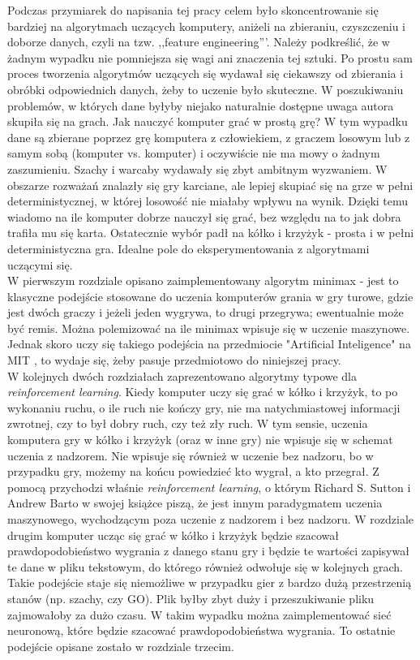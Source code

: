 \documentclass[licencjacka]{pracamgr}
\begin{document}
Podczas przymiarek do napisania tej pracy celem było skoncentrowanie się bardziej na algorytmach uczących komputery, aniżeli na zbieraniu, czyszczeniu i doborze danych, czyli na tzw. ,,feature engineering'''. Należy podkreślić,  że w żadnym wypadku nie pomniejsza się wagi ani znaczenia tej sztuki. Po prostu sam proces tworzenia algorytmów uczących się wydawał się ciekawszy od zbierania i obróbki odpowiednich danych, żeby to uczenie było skuteczne. W poszukiwaniu problemów, w których dane byłyby niejako naturalnie dostępne uwaga autora skupiła się na grach. Jak nauczyć komputer grać w prostą grę?  W tym wypadku dane są zbierane poprzez grę komputera z człowiekiem, z graczem losowym lub z samym sobą (komputer vs. komputer) i oczywiście nie ma mowy o żadnym zaszumieniu. Szachy i warcaby wydawały się zbyt ambitnym wyzwaniem. W obszarze rozważań znalazły się gry karciane, ale lepiej skupiać się na grze w pełni deterministycznej, w której losowość nie miałaby wpływu na wynik. Dzięki temu wiadomo na ile komputer dobrze nauczył się grać, bez względu na to jak dobra trafiła mu się karta. Ostatecznie wybór padł na kółko i krzyżyk - prosta i w pełni deterministyczna gra. Idealne pole do eksperymentowania z algorytmami uczącymi się. \\

W pierwszym rozdziale opisano zaimplementowany algorytm minimax - jest to klasyczne podejście stosowane do uczenia komputerów grania w gry turowe, gdzie jest dwóch graczy i jeżeli jeden wygrywa, to drugi przegrywa; ewentualnie może być remis.  Można polemizować na ile minimax wpisuje się w uczenie maszynowe. Jednak skoro uczy się takiego podejścia na przedmiocie "Artificial Inteligence"  na MIT \cite{MIT_AI},  to wydaje się, żeby pasuje przedmiotowo do niniejszej pracy.\\

W kolejnych dwóch rozdziałach zaprezentowano algorytmy typowe dla \textit{reinforcement learning}. Kiedy komputer uczy się grać w kółko i krzyżyk, to po wykonaniu ruchu, o ile ruch nie kończy gry,  nie ma natychmiastowej informacji zwrotnej, czy to był dobry ruch, czy też zły ruch. W tym sensie, uczenia komputera gry w kółko i krzyżyk (oraz w inne gry) nie wpisuje się w schemat uczenia z nadzorem. Nie wpisuje się również w uczenie bez nadzoru, bo w przypadku gry, możemy na końcu powiedzieć kto wygrał, a kto przegrał. Z pomocą przychodzi właśnie \textit{reinforcement learning}, o którym Richard S. Sutton i Andrew Barto w swojej książce \cite{RL} piszą, że jest innym paradygmatem uczenia maszynowego, wychodzącym poza uczenie z nadzorem i bez nadzoru.  W rozdziale drugim komputer ucząc się grać w kółko i krzyżyk będzie szacował prawdopodobieństwo wygrania z danego stanu gry i będzie te wartości zapisywał te dane w pliku tekstowym, do którego również odwołuje się w kolejnych grach. Takie podejście staje się niemożliwe w przypadku gier z bardzo dużą przestrzenią stanów (np. szachy, czy GO). Plik byłby zbyt duży i przeszukiwanie pliku zajmowałoby za dużo czasu. W takim wypadku można zaimplementować sieć neuronową, które będzie szacować prawdopodobieństwa wygrania. To ostatnie podejście opisane zostało w rozdziale trzecim. \\
\end{document}
